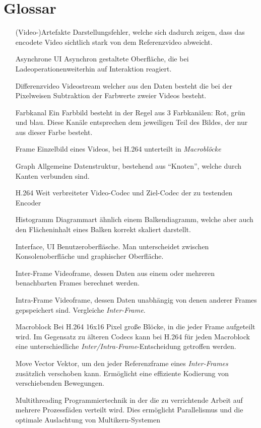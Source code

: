 \section{Glossar}

\begin{itemize}
    \item[(Video-)Artefakte] Darstellungsfehler, welche sich dadurch zeigen, dass das encodete Video sichtlich stark von dem Referenzvideo abweicht.
    \item[Asynchrone UI] Asynchron gestaltete Oberfläche, die bei Ladeoperationenweiterhin auf Interaktion reagiert.
    \item[Differenzvideo] Videostream welcher aus den Daten besteht die bei der Pixelweisen Subtraktion der Farbwerte zweier Videos besteht.
    \item[Farbkanal] Ein Farbbild besteht in der Regel aus 3 Farbkanälen: Rot, grün und blau. Diese Kanäle entsprechen dem jeweiligen Teil des Bildes, der nur aus dieser Farbe besteht.
    \item[Frame] Einzelbild eines Videos, bei H.264 unterteilt in \emph{Macroblöcke}
    \item[Graph] Allgemeine Datenstruktur, bestehend aus ``Knoten'', welche durch Kanten verbunden sind.
    \item[H.264] Weit verbreiteter Video-Codec und Ziel-Codec der zu testenden Encoder
    \item[Histogramm] Diagrammart ähnlich einem Balkendiagramm, welche aber auch den Flächeninhalt eines Balken korrekt skaliert darstellt.
    \item[Interface, UI] Benutzeroberfläsche. Man unterscheidet zwischen Konsolenoberfläche und graphischer Oberfläche.
    \item[Inter-Frame] Videoframe, dessen Daten aus einem oder mehreren benachbarten Frames berechnet werden.
    \item[Intra-Frame] Videoframe, dessen Daten unabhängig von denen anderer Frames gepspeichert sind. Vergleiche \emph{Inter-Frame}.
    \item[Macroblock] Bei H.264 16x16 Pixel große Blöcke, in die jeder Frame aufgeteilt wird. Im Gegensatz zu älteren Codecs kann bei H.264 für jeden Macroblock eine unterschiedliche \emph{Inter/Intra-Frame}-Entscheidung getroffen werden. 
    \item[Move Vector] Vektor, um den jeder Referenzframe eines \emph{Inter-Frames} zusätzlich verschoben kann. Ermöglicht eine effiziente Kodierung von verschiebenden Bewegungen.
    \item[Multithreading] Programmiertechnik in der die zu verrichtende Arbeit auf mehrere Prozessfäden verteilt wird. Dies ermöglicht Parallelismus und die optimale Auslachtung von Multikern-Systemen

\end{itemize}
